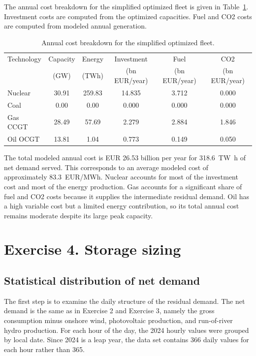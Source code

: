 \documentclass[a4paper]{report}
\begin{document}
The annual cost breakdown for the simplified optimized fleet is given in Table~\ref{tab:exercise3-costs}. Investment costs are computed from the optimized capacities. Fuel and CO2 costs are computed from modeled annual generation.

\begin{table}[H]
  \centering
  \caption{Annual cost breakdown for the simplified optimized fleet.}
  \label{tab:exercise3-costs}
  \begin{tabular}{lccccc}
    \toprule
    Technology & Capacity & Energy & Investment & Fuel & CO2 \\
    & (GW) & (TWh) & (bn EUR/year) & (bn EUR/year) & (bn EUR/year) \\
    \midrule
    Nuclear & 30.91 & 259.83 & 14.835 & 3.712 & 0.000 \\
    Coal & 0.00 & 0.00 & 0.000 & 0.000 & 0.000 \\
    Gas CCGT & 28.49 & 57.69 & 2.279 & 2.884 & 1.846 \\
    Oil OCGT & 13.81 & 1.04 & 0.773 & 0.149 & 0.050 \\
    \bottomrule
  \end{tabular}
\end{table}

The total modeled annual cost is EUR 26.53 billion per year for \SI{318.6}{\tera\watt\hour} of net demand served. This corresponds to an average modeled cost of approximately \SI{83.3}{EUR/MWh}. Nuclear accounts for most of the investment cost and most of the energy production. Gas accounts for a significant share of fuel and CO2 costs because it supplies the intermediate residual demand. Oil has a high variable cost but a limited energy contribution, so its total annual cost remains moderate despite its large peak capacity.

\section{Exercise 4. Storage sizing}

\subsection{Statistical distribution of net demand}

The first step is to examine the daily structure of the residual demand. The net demand is the same as in Exercise 2 and Exercise 3, namely the gross consumption minus onshore wind, photovoltaic production, and run-of-river hydro production. For each hour of the day, the 2024 hourly values were grouped by local date. Since 2024 is a leap year, the data set contains 366 daily values for each hour rather than 365.
\end{document}
